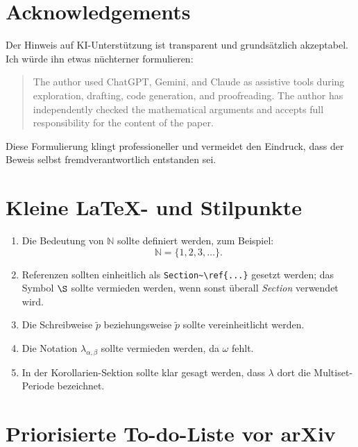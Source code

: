 \documentclass[11pt]{article}
\newcommand{\code}[1]{\texttt{#1}}
\begin{document}
\section{Acknowledgements}

Der Hinweis auf KI-Unterstützung ist transparent und grundsätzlich akzeptabel. Ich würde ihn etwas nüchterner formulieren:

\begin{quote}
The author used ChatGPT, Gemini, and Claude as assistive tools during exploration, drafting, code generation, and proofreading. The author has independently checked the mathematical arguments and accepts full responsibility for the content of the paper.
\end{quote}

Diese Formulierung klingt professioneller und vermeidet den Eindruck, dass der Beweis selbst fremdverantwortlich entstanden sei.

\section{Kleine LaTeX- und Stilpunkte}

\begin{enumerate}[leftmargin=2em]
    \item Die Bedeutung von \(\mathbb N\) sollte definiert werden, zum Beispiel:
    \[
        \mathbb N=\{1,2,3,\ldots\}.
    \]
    \item Referenzen sollten einheitlich als \code{Section\textasciitilde\textbackslash ref\{...\}} gesetzt werden; das Symbol \(\S\) sollte vermieden werden, wenn sonst überall \emph{Section} verwendet wird.
    \item Die Schreibweise \(\tilde p\) beziehungsweise \(\tilde{p}\) sollte vereinheitlicht werden.
    \item Die Notation \(\lambda_{\alpha,\beta}\) sollte vermieden werden, da \(\omega\) fehlt.
    \item In der Korollarien-Sektion sollte klar gesagt werden, dass \(\lambda\) dort die Multiset-Periode bezeichnet.
\end{enumerate}

\section*{Priorisierte To-do-Liste vor arXiv}
\end{document}
